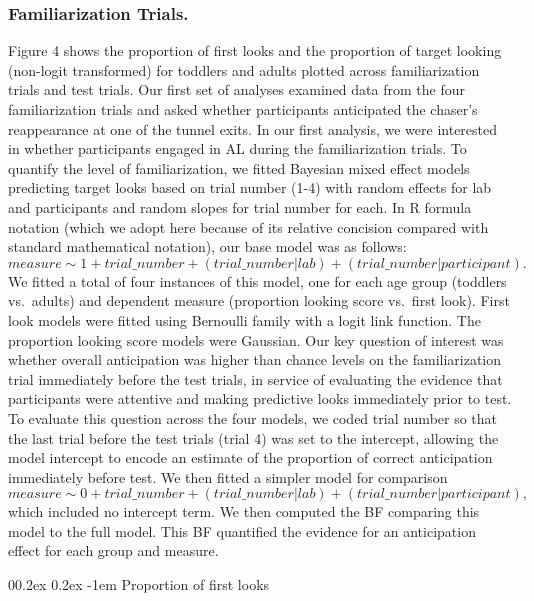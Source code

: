 \documentclass[
  man,floatsintext]{apa6}
\makeatletter
\let\oldparagraph\paragraph
\renewcommand{\paragraph}{
    \@ifstar
      \xxxParagraphStar
      \xxxParagraphNoStar
  }
\newcommand{\xxxParagraphStar}[1]{\oldparagraph*{#1}\mbox{}}
\newcommand{\xxxParagraphNoStar}[1]{\oldparagraph{#1}\mbox{}}
\renewcommand{\paragraph}{\@startsection{paragraph}{4}{\parindent}%
  {0\baselineskip \@plus 0.2ex \@minus 0.2ex}%
  {-1em}%
  {\normalfont\normalsize\bfseries\itshape\typesectitle}}
\makeatother
\begin{document}
\subsubsection{Familiarization Trials.}\label{familiarization-trials.}

Figure 4 shows the proportion of first looks and the proportion of target looking (non-logit transformed) for toddlers and adults plotted across familiarization trials and test trials. Our first set of analyses examined data from the four familiarization trials and asked whether participants anticipated the chaser's reappearance at one of the tunnel exits. In our first analysis, we were interested in whether participants engaged in AL during the familiarization trials. To quantify the level of familiarization, we fitted Bayesian mixed effect models predicting target looks based on trial number (1-4) with random effects for lab and participants and random slopes for trial number for each.
In R formula notation (which we adopt here because of its relative concision compared with standard mathematical notation), our base model was as follows:
\(measure \sim 1 + trial\_number +  (trial\_number | lab) + (trial\_number | participant).\)
We fitted a total of four instances of this model, one for each age group (toddlers vs.~adults) and dependent measure (proportion looking score vs.~first look). First look models were fitted using Bernoulli family with a logit link function. The proportion looking score models were Gaussian.
Our key question of interest was whether overall anticipation was higher than chance levels on the familiarization trial immediately before the test trials, in service of evaluating the evidence that participants were attentive and making predictive looks immediately prior to test. To evaluate this question across the four models, we coded trial number so that the last trial before the test trials (trial 4) was set to the intercept, allowing the model intercept to encode an estimate of the proportion of correct anticipation immediately before test. We then fitted a simpler model for comparison
\(measure \sim 0 + trial\_number +  (trial\_number | lab) + (trial\_number | participant),\)
which included no intercept term. We then computed the BF comparing this model to the full model. This BF quantified the evidence for an anticipation effect for each group and measure.

\paragraph{Proportion of first looks}\label{proportion-of-first-looks}
\end{document}
